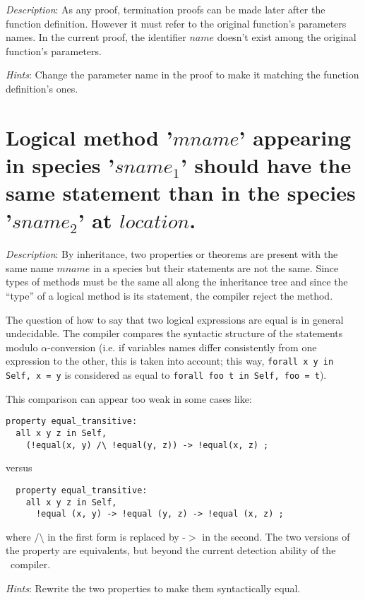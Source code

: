 {\em Description}: As any proof, termination proofs can be made later
after the function definition. However it must refer to the original
function's parameters names. In the current proof, the identifier
$name$ doesn't exist among the original function's parameters.

{\em Hints}: Change the parameter name in the proof to make it
matching the function definition's ones.



\section*{Logical method '$mname$' appearing in species
  '$sname_1$' should have the same statement than in the species
  '$sname_2$' at $location$.} 
{\em Description}: By inheritance, two properties or theorems are
present with the same name $mname$ in a species but their statements
are not the same. Since types of methods must be the same all along the
inheritance tree and since the ``type'' of a logical method is its
statement, the compiler reject the method.

The question of how to say that two logical expressions are equal is
in general undecidable. The compiler compares the syntactic structure
of the statements modulo $\alpha$-conversion (i.e. if variables names
differ consistently from one expression to the other, this is taken
into account; this way, {\tt forall x y in Self, x = y} is considered
as equal to {\tt forall foo t in Self, foo = t}).

This comparison can appear too weak in some cases like:
{\scriptsize
\begin{lstlisting}
property equal_transitive:
  all x y z in Self,
    (!equal(x, y) /\ !equal(y, z)) -> !equal(x, z) ;
\end{lstlisting}
}
versus
{\scriptsize
\begin{lstlisting}
  property equal_transitive:
    all x y z in Self,
      !equal (x, y) -> !equal (y, z) -> !equal (x, z) ;
\end{lstlisting}
}
where $/\setminus$ in the first form is replaced by -$>$ in the
second. The two versions of the property are equivalents, but beyond
the current detection ability of the \focal\ compiler.


{\em Hints}: Rewrite the two properties to make them syntactically
equal.



